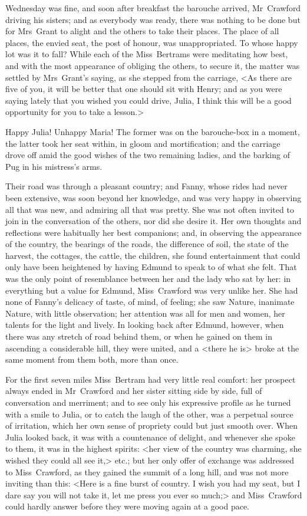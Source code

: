 Wednesday was fine, and soon after breakfast the barouche arrived, Mr~Crawford driving his sisters; and as everybody was ready, there was nothing to be done but for Mrs~Grant to alight and the others to take their places. The place of all places, the envied seat, the post of honour, was unappropriated. To whose happy lot was it to fall? While each of the Miss~Bertrams were meditating how best, and with the most appearance of obliging the others, to secure it, the matter was settled by Mrs~Grant's saying, as she stepped from the carriage, <As there are five of you, it will be better that one should sit with Henry; and as you were saying lately that you wished you could drive, Julia, I think this will be a good opportunity for you to take a lesson.>

Happy Julia! Unhappy Maria! The former was on the barouche-box in a moment, the latter took her seat within, in gloom and mortification; and the carriage drove off amid the good wishes of the two remaining ladies, and the barking of Pug in his mistress's arms.

Their road was through a pleasant country; and Fanny, whose rides had never been extensive, was soon beyond her knowledge, and was very happy in observing all that was new, and admiring all that was pretty. She was not often invited to join in the conversation of the others, nor did she desire it. Her own thoughts and reflections were habitually her best companions; and, in observing the appearance of the country, the bearings of the roads, the difference of soil, the state of the harvest, the cottages, the cattle, the children, she found entertainment that could only have been heightened by having Edmund to speak to of what she felt. That was the only point of resemblance between her and the lady who sat by her: in everything but a value for Edmund, Miss~Crawford was very unlike her. She had none of Fanny's delicacy of taste, of mind, of feeling; she saw Nature, inanimate Nature, with little observation; her attention was all for men and women, her talents for the light and lively. In looking back after Edmund, however, when there was any stretch of road behind them, or when he gained on them in ascending a considerable hill, they were united, and a <there he is> broke at the same moment from them both, more than once.

For the first seven miles Miss~Bertram had very little real comfort: her prospect always ended in Mr~Crawford and her sister sitting side by side, full of conversation and merriment; and to see only his expressive profile as he turned with a smile to Julia, or to catch the laugh of the other, was a perpetual source of irritation, which her own sense of propriety could but just smooth over. When Julia looked back, it was with a countenance of delight, and whenever she spoke to them, it was in the highest spirits: <her view of the country was charming, she wished they could all see it,> etc.; but her only offer of exchange was addressed to Miss~Crawford, as they gained the summit of a long hill, and was not more inviting than this: <Here is a fine burst of country. I wish you had my seat, but I dare say you will not take it, let me press you ever so much;> and Miss~Crawford could hardly answer before they were moving again at a good pace.

